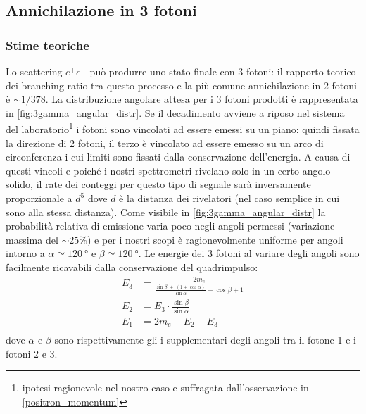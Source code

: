 \subsection{Annichilazione in 3 fotoni}

\subsubsection{Stime teoriche}
Lo scattering $e^+e^-$ può produrre uno stato finale con 3 fotoni: il rapporto teorico dei branching ratio tra questo processo e la più comune annichilazione in 2 fotoni è $\sim 1/378$\cite{3gamma}. La distribuzione angolare attesa per i 3 fotoni prodotti è rappresentata in \autoref{fig:3gamma_angular_distr}. Se il decadimento avviene a riposo nel sistema del laboratorio\footnote{ipotesi ragionevole nel nostro caso e suffragata dall'osservazione in \autoref{positron_momentum}} i fotoni sono vincolati ad essere emessi su un piano: quindi fissata la direzione di 2 fotoni, il terzo è vincolato ad essere emesso su un arco di circonferenza i cui limiti sono fissati dalla conservazione dell'energia. A causa di questi vincoli e poiché i nostri spettrometri rivelano solo in un certo angolo solido, il rate dei conteggi per questo tipo di segnale sarà inversamente proporzionale a $d^5$ dove $d$ è la distanza dei rivelatori (nel caso semplice in cui sono alla stessa distanza).
Come visibile in \autoref{fig:3gamma_angular_distr} la probabilità relativa di emissione varia poco negli angoli permessi (variazione massima del $\sim 25\%$) e per i nostri scopi è ragionevolmente uniforme per angoli intorno a $\alpha\simeq \SI{120}{\degree}$ e $\beta\simeq\SI{120}{\degree}$.
Le energie dei 3 fotoni al variare degli angoli sono facilmente ricavabili dalla conservazione del quadrimpulso:
\begin{align*}
\label{eq:3gamma_energy}
E_3 &= \frac{2 m_e}{\frac{\sin\beta \;+\;(1+\cos\alpha)}{\sin\alpha}+\cos\beta+1}\\
E_2 &= E_3 \cdot \frac{\sin\beta}{\sin\alpha}\\
E_1 &= 2m_e - E_2 - E_3\\
\end{align*}
dove $\alpha$ e $\beta$ sono rispettivamente gli i supplementari degli angoli tra il fotone 1 e i fotoni 2 e 3.

